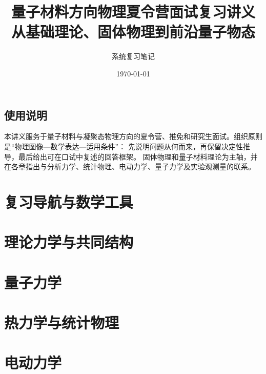 \documentclass[a4paper,openany,fontset=fandol,zihao=-4]{ctexbook}
\title{量子材料方向物理夏令营面试复习讲义\\[0.4em]\large 从基础理论、固体物理到前沿量子物态}
\author{系统复习笔记}
\date{\today}
\newcommand{\currentparttitle}{复习导航}
\begin{document}
\maketitle
\chapter*{使用说明}
本讲义服务于量子材料与凝聚态物理方向的夏令营、推免和研究生面试。组织原则是“物理图像---数学表达---适用条件”：
先说明问题从何而来，再保留决定性推导，最后给出可在口试中复述的回答框架。
固体物理和量子材料理论为主轴，并在各章指出与分析力学、统计物理、电动力学、量子力学及实验观测量的联系。
\tableofcontents
\part{复习导航与数学工具}
\label{part:navigation}
\renewcommand{\currentparttitle}{复习导航与数学工具}



\part{理论力学与共同结构}
\label{part:mechanics}
\renewcommand{\currentparttitle}{理论力学与共同结构}




\part{量子力学}
\label{part:quantum}
\renewcommand{\currentparttitle}{量子力学}







\part{热力学与统计物理}
\label{part:statistics}
\renewcommand{\currentparttitle}{热力学与统计物理}





\part{电动力学}
\label{part:electrodynamics}
\renewcommand{\currentparttitle}{电动力学}



\end{document}
